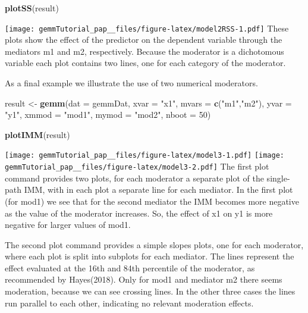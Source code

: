 \documentclass[man,floatsintext]{apa6}
\newenvironment{Shaded}{\begin{snugshade}}{\end{snugshade}}
\newcommand{\KeywordTok}[1]{\textcolor[rgb]{0.13,0.29,0.53}{\textbf{#1}}}
\newcommand{\DataTypeTok}[1]{\textcolor[rgb]{0.13,0.29,0.53}{#1}}
\newcommand{\DecValTok}[1]{\textcolor[rgb]{0.00,0.00,0.81}{#1}}
\newcommand{\StringTok}[1]{\textcolor[rgb]{0.31,0.60,0.02}{#1}}
\newcommand{\NormalTok}[1]{#1}
\theoremstyle{definition}
\theoremstyle{definition}
\theoremstyle{definition}
\theoremstyle{remark}
\begin{document}
\begin{Shaded}
\begin{Highlighting}[]
\KeywordTok{plotSS}\NormalTok{(result)}
\end{Highlighting}
\end{Shaded}

\texttt{[image: gemmTutorial\_pap\_\_files/figure-latex/model2RSS-1.pdf]}
These plots show the effect of the predictor on the dependent variable
through the mediators m1 and m2, respectively. Because the moderator is
a dichotomous variable each plot contains two lines, one for each
category of the moderator.

As a final example we illustrate the use of two numerical moderators.

\begin{Shaded}
\begin{Highlighting}[]
\NormalTok{result <-}\StringTok{ }\KeywordTok{gemm}\NormalTok{(}\DataTypeTok{dat =}\NormalTok{ gemmDat, }
               \DataTypeTok{xvar  =} \StringTok{"x1"}\NormalTok{, }
               \DataTypeTok{mvars =} \KeywordTok{c}\NormalTok{(}\StringTok{"m1"}\NormalTok{,}\StringTok{"m2"}\NormalTok{), }
               \DataTypeTok{yvar  =} \StringTok{"y1"}\NormalTok{,}
               \DataTypeTok{xmmod =} \StringTok{"mod1"}\NormalTok{, }
               \DataTypeTok{mymod =} \StringTok{"mod2"}\NormalTok{,}
               \DataTypeTok{nboot =} \DecValTok{50}\NormalTok{)}

\KeywordTok{plotIMM}\NormalTok{(result)}
\end{Highlighting}
\end{Shaded}

\texttt{[image: gemmTutorial\_pap\_\_files/figure-latex/model3-1.pdf]}
\texttt{[image: gemmTutorial\_pap\_\_files/figure-latex/model3-2.pdf]} The
first plot command provides two plots, for each moderator a separate
plot of the single-path IMM, with in each plot a separate line for each
mediator. In the first plot (for mod1) we see that for the second
mediator the IMM becomes more negative as the value of the moderator
increases. So, the effect of x1 on y1 is more negative for larger values
of mod1.

The second plot command provides a simple slopes plots, one for each
moderator, where each plot is split into subplots for each mediator. The
lines represent the effect evaluated at the 16th and 84th percentile of
the moderator, as recommended by Hayes(2018). Only for mod1 and mediator
m2 there seems moderation, because we can see crossing lines. In the
other three cases the lines run parallel to each other, indicating no
relevant moderation effects.
\end{document}
